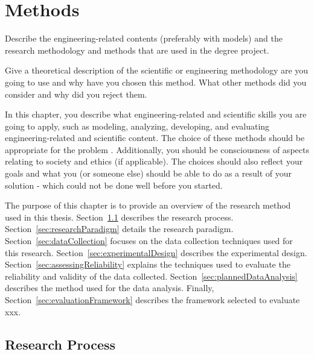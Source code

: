 \chapter{Methods}
\label{ch:whatYouDid}




Describe the engineering-related contents (preferably with models) and the research methodology and methods that are used in the degree project. 

Give a theoretical description of the scientific or engineering methodology are you going to use and why have you chosen this method. What other methods did you consider and why did you reject them.

In this chapter, you describe what engineering-related and scientific skills you are going to apply, such as modeling, analyzing, developing, and evaluating engineering-related and scientific content. The choice of these methods should be appropriate for the problem . Additionally, you should be consciousness of aspects relating to society and ethics (if applicable). The choices should also reflect your goals and what you (or someone else) should be able to do as a result of your solution - which could not be done well before you started.

The purpose of this chapter is to provide an overview of the research method
used in this thesis. Section~\ref{sec:researchProcess} describes the research
process. Section~\ref{sec:researchParadigm} details the research
paradigm. Section~\ref{sec:dataCollection} focuses on the data collection
techniques used for this research. Section~\ref{sec:experimentalDesign}
describes the experimental design. Section~\ref{sec:assessingReliability}
explains the techniques used to evaluate the reliability and validity of the
data collected. Section~\ref{sec:plannedDataAnalysis} describes the method
used for the data analysis. Finally, Section~\ref{sec:evaluationFramework}
describes the framework selected to evaluate xxx.


\section{Research Process}
\label{sec:researchProcess}
 
